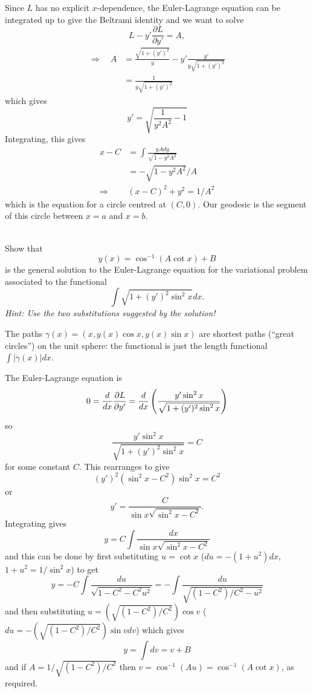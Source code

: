 \documentclass[12pt]{article}
\begin{document}
\begin{answer}
Since $L$ has no explicit $x$-dependence, the Euler-Lagrange equation can be integrated up to give the Beltrami identity and we want to solve
\[L-y'\frac{\partial L}{\partial y'}=A,\]
\begin{align*}
\Rightarrow\quad A&=\frac{\sqrt{1+(y')^2}}{y}-y'\frac{y'}{y\sqrt{1+(y')^2}}\\
&=\frac{1}{y\sqrt{1+(y')^2}}
\end{align*}
which gives
\[y'=\sqrt{\frac{1}{y^2A^2}-1}\]
Integrating, this gives
\begin{align*}x-C&=\int\frac{yAdy}{\sqrt{1-y^2A^2}}\\
&=-\sqrt{1-y^2A^2}/A\\
\Rightarrow&(x-C)^2+y^2=1/A^2\end{align*}
which is the equation for a circle centred at $(C,0)$. Our geodesic is the segment of this circle between $x=a$ and $x=b$.
\end{answer}

\newpage

\begin{question}\ \\
Show that
\[y(x)=\cos^{-1}(A\cot x)+B\]
is the general solution to the Euler-Lagrange equation for the variational problem associated to the functional
\[\int\sqrt{1+(y')^2\sin^2x}dx.\]
{\em Hint: Use the two substitutions suggested by the solution!}
\begin{rmk}
The paths $\gamma(x)=(x,y(x)\cos x,y(x)\sin x)$ are shortest paths (``great circles'') on the unit sphere: the functional is just the length functional $\int|\dot{\gamma}(x)|dx$.
\end{rmk}
\end{question}

\bigskip

\begin{answer}
The Euler-Lagrange equation is
\[0=\dfrac{d }{d x}\dfrac{\partial L}{\partial y'}=\dfrac{d }{d x}\left(\frac{y'\sin^2x}{\sqrt{1+(y')^2\sin^2x}}\right)\]
so
\[\frac{y'\sin^2x}{\sqrt{1+(y')^2\sin^2x}}=C\]
for some constant $C$. This rearranges to give
\[(y')^2(\sin^2x-C^2)\sin^2x=C^2\]
or
\[y'=\frac{C}{\sin x\sqrt{\sin^2x-C^2}}.\]
Integrating gives
\[y=C\int\frac{dx}{\sin x\sqrt{\sin^2x-C^2}}\]
and this can be done by first substituting $u=\cot x$ ($du=-(1+u^2)dx$, $1+u^2=1/\sin^2x$) to get
\[y=-C\int\frac{du}{\sqrt{1-C^2-C^2u^2}}=-\int\frac{du}{\sqrt{(1-C^2)/C^2-u^2}}\]
and then substituting $u=\left(\sqrt{(1-C^2)/C^2}\right)\cos v$ ($du=-\left(\sqrt{(1-C^2)/C^2}\right)\sin vdv$) which gives
\[y=\int dv=v+B\]
and if $A=1/\sqrt{(1-C^2)/C^2}$ then $v=\cos^{-1}(Au)=\cos^{-1}(A\cot x)$, as required.
\end{answer}
\end{document}
